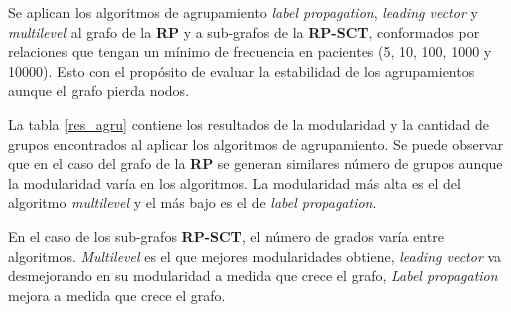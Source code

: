 Se aplican los algoritmos de agrupamiento \textit{label propagation}, \textit{leading vector} y \textit{multilevel} al grafo de la \textbf{\acrshort{RP}} y a sub-grafos de la  \textbf{\acrshort{RP-SCT}}, conformados por relaciones que tengan un mínimo de frecuencia en pacientes (\num{5}, \num{10}, \num{100}, \num{1000} y \num{10000}). Esto con el propósito de evaluar la estabilidad de los agrupamientos aunque el grafo pierda nodos.

La tabla \ref{res_agru} contiene los resultados de la modularidad y la cantidad de grupos encontrados al aplicar los algoritmos de agrupamiento. Se puede observar que en el caso del grafo de la \textbf{\acrshort{RP}}  se generan similares número de grupos aunque la modularidad varía en los algoritmos. La modularidad más alta es el del algoritmo \textit{multilevel} y el más bajo es el de \textit{label propagation}.

En el caso de los sub-grafos \textbf{\acrshort{RP-SCT}}, el número de grados varía entre algoritmos. \textit{Multilevel} es el que mejores modularidades obtiene, \textit{leading vector} va desmejorando en su modularidad a medida que crece el grafo, \textit{Label propagation} mejora a medida que crece el grafo. 

